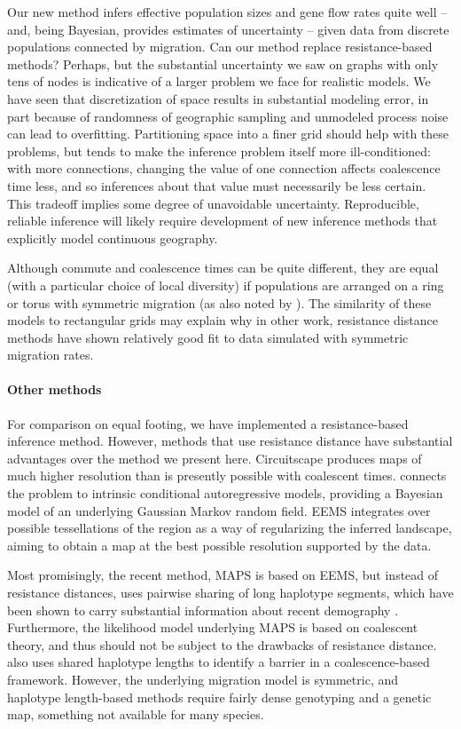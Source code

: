 \documentclass{article}
\begin{document}
Our new method infers effective population sizes and gene flow rates quite well 
-- and, being Bayesian, provides estimates of uncertainty --
given data from discrete populations connected by migration.
Can our method replace resistance-based methods?
Perhaps, but
the substantial uncertainty we saw on graphs with only tens of nodes
is indicative of a larger problem we face for realistic models.
We have seen that discretization of space results in substantial modeling error,
in part because of randomness of geographic sampling
and unmodeled process noise can lead to overfitting.
Partitioning space into a finer grid should help with these problems,
but tends to make the inference problem itself more ill-conditioned:
with more connections,
changing the value of one connection affects coalescence time less,
and so inferences about that value must necessarily be less certain.
This tradeoff implies some degree of unavoidable uncertainty.
Reproducible, reliable inference will likely require development of new inference methods
that explicitly model continuous geography.


Although commute and coalescence times can be quite different,
they are equal (with a particular choice of local diversity)
if populations are arranged on a ring or torus
with symmetric migration
(as also noted by \citet{mcrae2006isolation}).
The similarity of these models to rectangular grids
may explain why in other work, resistance distance methods have shown relatively good fit to data
simulated with symmetric migration rates.


\paragraph{Other methods}
For comparison on equal footing, we have implemented a resistance-based inference method.
However, methods that use resistance distance have substantial advantages over the method we present here.
Circuitscape \citep{mcrae2008using} produces maps of much higher resolution 
than is presently possible with coalescent times.
\citet{hanks2013circuit} connects the problem to intrinsic conditional autoregressive models, 
providing a Bayesian model of an underlying Gaussian Markov random field.
EEMS \citep{petkova2014visualizing} integrates over possible tessellations of the region
as a way of regularizing the inferred landscape,
aiming to obtain a map at the best possible resolution supported by the data.

Most promisingly, the recent method, MAPS \citep{alasadi2018estimating}
is based on EEMS, but instead of resistance distances,
uses pairwise sharing of long haplotype segments,
which have been shown to carry substantial information about recent demography
\citep{ralph2013geography,palamara2013inference,browning2015accurate,ringbauer2017inferring}.
Furthermore, the likelihood model underlying MAPS is based on coalescent theory,
and thus should not be subject to the drawbacks of resistance distance.
\citet{ringbauer2018estimating} also uses shared haplotype lengths
to identify a barrier in a coalescence-based framework.
However, the underlying migration model is symmetric,
and haplotype length-based methods require fairly dense genotyping and a genetic map,
something not available for many species.
\end{document}
